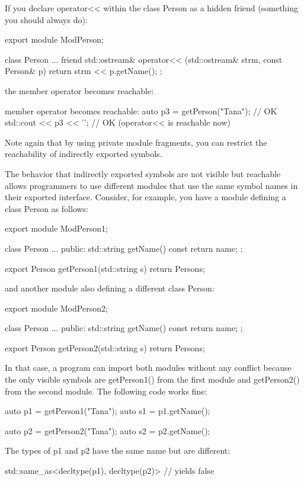 If you declare operator<< within the class Person as a hidden friend (something you should always do):

\begin{cpp}
export module ModPerson;

class Person {
	...
	friend std::ostream& operator<< (std::ostream& strm, const Person& p) {
		return strm << p.getName();
	}
};
\end{cpp}

the member operator becomes reachable:

\begin{cpp}
member operator becomes reachable:
auto p3 = getPerson("Tana"); // OK
std::cout << p3 << '\n'; // OK (operator<< is reachable now)
\end{cpp}

Note again that by using private module fragments, you can restrict the reachability of indirectly exported symbols.


The behavior that indirectly exported symbols are not visible but reachable allows programmers to use different modules that use the same symbol names in their exported interface. Consider, for example, you have a module defining a class Person as follows:

\begin{cpp}
export module ModPerson1;

class Person {
	...
	public:
	std::string getName() const {
		return name;
	}
};

export Person getPerson1(std::string s) {
	return Person{s};
}
\end{cpp}

and another module also defining a different class Person:

\begin{cpp}
export module ModPerson2;

class Person {
	...
	public:
	std::string getName() const {
		return name;
	}
};

export Person getPerson2(std::string s) {
	return Person{s};
}
\end{cpp}

In that case, a program can import both modules without any conflict because the only visible symbols are getPerson1() from the first module and getPerson2() from the second module. The following code works fine:

\begin{cpp}
auto p1 = getPerson1("Tana");
auto s1 = p1.getName();

auto p2 = getPerson2("Tana");
auto s2 = p2.getName();
\end{cpp}

The types of p1 and p2 have the same name but are different:

\begin{cpp}
std::same_as<decltype(p1), decltype(p2)> // yields false
\end{cpp}











